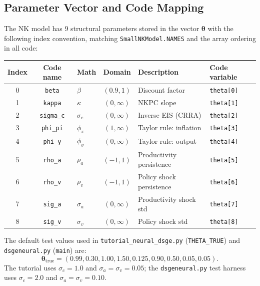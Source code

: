 \documentclass[11pt,a4paper]{article}
\theoremstyle{definition}
\newcommand{\btheta}{\boldsymbol{\theta}}
\newcommand{\code}[1]{\texttt{\color{codecolor}#1}}
\begin{document}
	\subsection{Parameter Vector and Code Mapping}
	\label{sec:param_mapping}
	
	The NK model has 9 structural parameters stored in the vector $\btheta$ with the following index convention, matching \code{SmallNKModel.NAMES} and the array ordering in all code:
	
	\begin{center}
		\begin{tabular}{cclcll}
			\toprule
			Index & Code name & Math & Domain & Description & Code variable \\
			\midrule
			0 & \code{beta} & $\beta$ & $(0.9, 1)$ & Discount factor & \code{theta[0]} \\
			1 & \code{kappa} & $\kappa$ & $(0, \infty)$ & NKPC slope & \code{theta[1]} \\
			2 & \code{sigma\_c} & $\sigma_c$ & $(0, \infty)$ & Inverse EIS (CRRA) & \code{theta[2]} \\
			3 & \code{phi\_pi} & $\phi_\pi$ & $(1, \infty)$ & Taylor rule: inflation & \code{theta[3]} \\
			4 & \code{phi\_y} & $\phi_y$ & $(0, \infty)$ & Taylor rule: output & \code{theta[4]} \\
			5 & \code{rho\_a} & $\rho_a$ & $(-1, 1)$ & Productivity persistence & \code{theta[5]} \\
			6 & \code{rho\_v} & $\rho_v$ & $(-1, 1)$ & Policy shock persistence & \code{theta[6]} \\
			7 & \code{sig\_a} & $\sigma_a$ & $(0, \infty)$ & Productivity shock std & \code{theta[7]} \\
			8 & \code{sig\_v} & $\sigma_v$ & $(0, \infty)$ & Policy shock std & \code{theta[8]} \\
			\bottomrule
		\end{tabular}
	\end{center}
	
	The default test values used in \code{tutorial\_neural\_dsge.py} (\code{THETA\_TRUE}) and \code{dsgeneural.py} (\code{main}) are:
	\begin{equation}\label{eq:theta_true}
		\btheta_{\mathrm{true}} = (0.99, 0.30, 1.00, 1.50, 0.125, 0.90, 0.50, 0.05, 0.05).
	\end{equation}
	The tutorial uses $\sigma_c = 1.0$ and $\sigma_a = \sigma_v = 0.05$; the \code{dsgeneural.py} test harness uses $\sigma_c = 2.0$ and $\sigma_a = \sigma_v = 0.10$.
	
\end{document}
